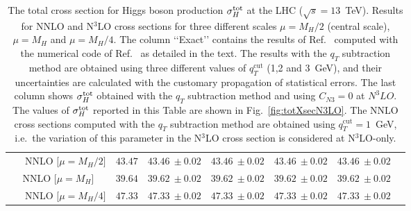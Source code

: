 \documentclass[12pt]{article}
\DeclareRobustCommand{\qt}{q_T}
\DeclareRobustCommand{\qtcut}{\ensuremath{q_T^\mathrm{cut}}}
\begin{document}
\begin{table}
{\begin{tabular}{ |c||c|c|c|c|c|c| }
\hline

\multirow{1}{*}{~~~NNLO  {\scriptsize$\big[\mu=M_{H}/2\big]$} } 

& $43.47$%

& $43.46~\pm 0.02$

& $43.46~\pm 0.02$

& $43.46~\pm 0.02$ 

& $43.46~\pm 0.02$  \\

\multirow{1}{*}{NNLO  {\scriptsize$\big[\mu=M_{H}\big]$} } 

& $39.64$%

& $39.62~\pm 0.02$ 

& $39.62~\pm 0.02$ 

& $39.62~\pm 0.02$ 

& $39.62~\pm 0.02$ \\

\multirow{1}{*}{~~~NNLO  {\scriptsize$\big[\mu=M_{H}/4\big]$} } 

& $47.33$%

& $47.33~\pm 0.02$  

& $47.33~\pm 0.02$

& $47.33~\pm 0.02$  

& $47.33~\pm 0.02$ \\

\hline

\end{tabular}
}
\caption{\label{Table:totXsec}
{The total cross section for Higgs boson production $\sigma_{H}^{{\rm {tot}}}$ at the LHC ($\sqrt{s}=13$~TeV). Results for NNLO and N$^{3}$LO cross sections for three different scales $\mu=M_{H}/2$ (central scale), $\mu=M_{H}$ and $\mu=M_{H}/4$. The column \lq{}\lq{}Exact\rq{}\rq{} contains the results of Ref.~\cite{Mistlberger:2018etf} computed with the numerical code of Ref.~\cite{Dulat:2018rbf} as detailed in the text. The results with the $\qt$ subtraction method are obtained using three different values of $\qtcut$ (1,2 and 3~GeV), and their uncertainties are calculated with the customary propagation of statistical errors. The last column shows $ \sigma_{H}^{{\rm {tot}}}$ obtained with the $\qt$ subtraction method and using $C_{N3}=0$ at $N^{3}LO$. The values of $ \sigma_{H}^{{\rm {tot}}}$ reported in this Table are shown in Fig.~\ref{fig:totXsecN3LO}. The NNLO cross sections computed with the $\qt$ subtraction method are obtained using $\qtcut=1$~GeV, i.e.\ the variation of this parameter in the N$^{3}$LO cross section is considered at N$^{3}$LO-only.
}
}

\end{table}
\end{document}
